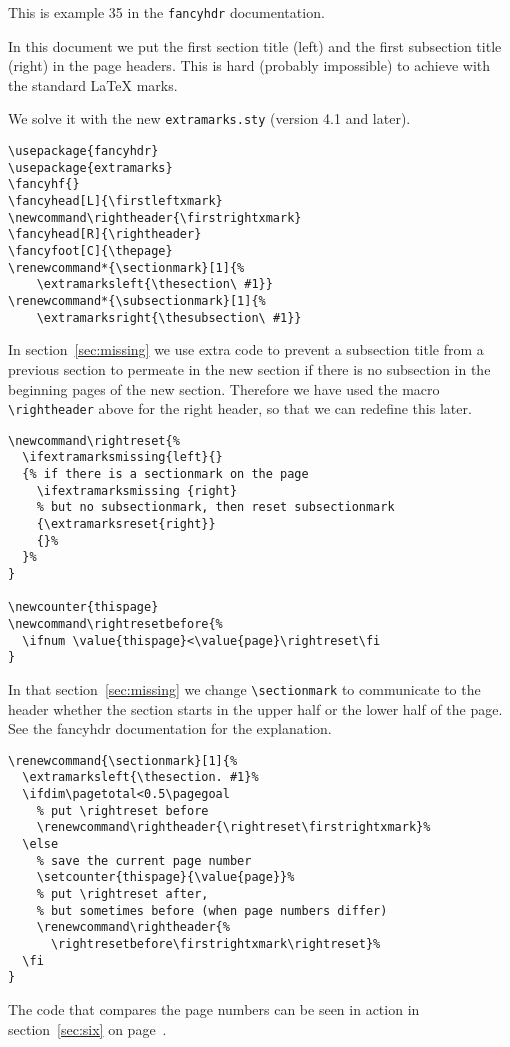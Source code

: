 \documentclass{article}
\newcommand\rightheader{\firstrightxmark}
\renewcommand*{\sectionmark}[1]{\extramarksleft{\thesection\ #1}}
\renewcommand*{\subsectionmark}[1]{\extramarksright{\thesubsection\ #1}}
\newcommand\rightreset{%
  \ifextramarksmissing{left}{}
  {%
    \ifextramarksmissing {right}
    {\extramarksreset{right}}
    {}%
  }%
}
\newcounter{thispage}
\newcommand\rightresetbefore{%
  \ifnum \value{thispage}<\value{page}\rightreset\fi
}
\begin{document}
\pagestyle{plain}
\tableofcontents

\bigskip

\noindent
\begin{boxedminipage}{\textwidth}
This is example 35 in the \texttt{fancyhdr} documentation.

In this document we put the first section title (left) and the first subsection title (right) in the page headers. This is hard (probably impossible) to achieve with the standard \LaTeX{} marks.

We solve it with the new \texttt{extramarks.sty} (version 4.1 and later).

\begin{verbatim}
\usepackage{fancyhdr}
\usepackage{extramarks}
\fancyhf{}
\fancyhead[L]{\firstleftxmark}
\newcommand\rightheader{\firstrightxmark}
\fancyhead[R]{\rightheader}
\fancyfoot[C]{\thepage}
\renewcommand*{\sectionmark}[1]{%
    \extramarksleft{\thesection\ #1}}
\renewcommand*{\subsectionmark}[1]{%
    \extramarksright{\thesubsection\ #1}}
\end{verbatim}
\end{boxedminipage}

\begin{boxedminipage}{\textwidth}
In section~\ref{sec:missing} we use extra code to prevent a subsection title from a previous section to permeate in the new section if there is no subsection in the beginning pages of the new section. Therefore we have used the macro \verb|\rightheader| above for the right header, so that we can redefine this later.

\begin{verbatim}
\newcommand\rightreset{%
  \ifextramarksmissing{left}{}
  {% if there is a sectionmark on the page
    \ifextramarksmissing {right}
    % but no subsectionmark, then reset subsectionmark
    {\extramarksreset{right}}
    {}%
  }%
}

\newcounter{thispage}
\newcommand\rightresetbefore{% 
  \ifnum \value{thispage}<\value{page}\rightreset\fi
}
\end{verbatim}
In that section~\ref{sec:missing} we change \verb|\sectionmark| to communicate to the header whether the section starts in the upper half or the lower half of the page. See the \textsf{fancyhdr} documentation for the explanation.

\begin{verbatim}
\renewcommand{\sectionmark}[1]{%
  \extramarksleft{\thesection. #1}%
  \ifdim\pagetotal<0.5\pagegoal
    % put \rightreset before
    \renewcommand\rightheader{\rightreset\firstrightxmark}%
  \else
    % save the current page number
    \setcounter{thispage}{\value{page}}%
    % put \rightreset after,
    % but sometimes before (when page numbers differ)
    \renewcommand\rightheader{%
      \rightresetbefore\firstrightxmark\rightreset}%
  \fi
}
\end{verbatim}

The code that compares the page numbers can be seen in action in section~\ref{sec:six} on page~\pageref{sec:six}.

\end{boxedminipage}
\end{document}
